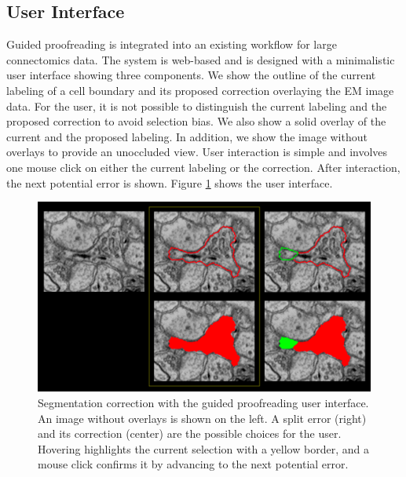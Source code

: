 \subsection{User Interface}

Guided proofreading is integrated into an existing workflow for large connectomics data. The system is web-based and is designed with a minimalistic user interface showing three components. We show the outline of the current labeling of a cell boundary and its proposed correction overlaying the EM image data. For the user, it is not possible to distinguish the current labeling and the proposed correction to avoid selection bias. We also show a solid overlay of the current and the proposed labeling. In addition, we show the image without overlays to provide an unoccluded view. User interaction is simple and involves one mouse click on either the current labeling or the correction. After interaction, the next potential error is shown. Figure \ref{fig:ui} shows the user interface.

\begin{figure}[h]
\begin{center}
  \includegraphics[width=\linewidth]{gfx/user_interface_split.pdf}
\end{center}
  \vspace{-4mm}
   \caption{Segmentation correction with the guided proofreading user interface. An image without overlays is shown on the left. A split error (right) and its correction (center) are the possible choices for the user. Hovering highlights the current selection with a yellow border, and a mouse click confirms it by advancing to the next potential error.}
\label{fig:ui}
\end{figure}

